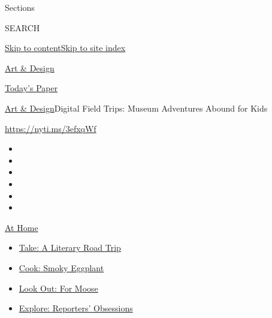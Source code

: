 Sections

SEARCH

\protect\hyperlink{site-content}{Skip to
content}\protect\hyperlink{site-index}{Skip to site index}

\href{https://www.nytimes.com/section/arts/design}{Art \& Design}

\href{https://myaccount.nytimes.com/auth/login?response_type=cookie\&client_id=vi}{}

\href{https://www.nytimes.com/section/todayspaper}{Today's Paper}

\href{/section/arts/design}{Art \& Design}\textbar{}Digital Field Trips:
Museum Adventures Abound for Kids

\url{https://nyti.ms/3efxqWf}

\begin{itemize}
\item
\item
\item
\item
\item
\item
\end{itemize}

\href{https://www.nytimes.com/spotlight/at-home?action=click\&pgtype=Article\&state=default\&region=TOP_BANNER\&context=at_home_menu}{At
Home}

\begin{itemize}
\tightlist
\item
  \href{https://www.nytimes.com/2020/07/28/books/time-for-a-literary-road-trip.html?action=click\&pgtype=Article\&state=default\&region=TOP_BANNER\&context=at_home_menu}{Take:
  A Literary Road Trip}
\item
  \href{https://www.nytimes.com/2020/07/29/magazine/bored-with-your-home-cooking-some-smoky-eggplant-will-fix-that.html?action=click\&pgtype=Article\&state=default\&region=TOP_BANNER\&context=at_home_menu}{Cook:
  Smoky Eggplant}
\item
  \href{https://www.nytimes.com/2020/07/27/travel/moose-michigan-isle-royale.html?action=click\&pgtype=Article\&state=default\&region=TOP_BANNER\&context=at_home_menu}{Look
  Out: For Moose}
\item
  \href{https://www.nytimes.com/interactive/2020/at-home/even-more-reporters-editors-diaries-lists-recommendations.html?action=click\&pgtype=Article\&state=default\&region=TOP_BANNER\&context=at_home_menu}{Explore:
  Reporters' Obsessions}
\end{itemize}

